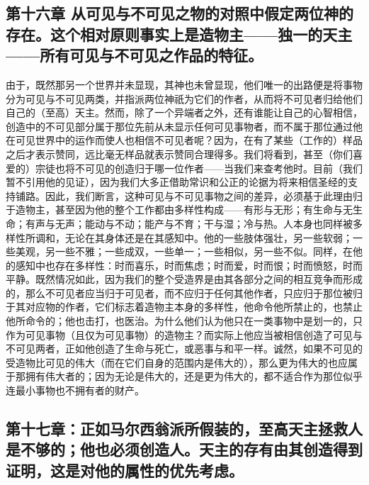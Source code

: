 \subsection{第十六章 从可见与不可见之物的对照中假定两位神的存在。这个相对原则事实上是造物主——独一的天主——所有可见与不可见之作品的特征。}

由于，既然那另一个世界并未显现，其神也未曾显现，他们唯一的出路便是将事物分为可见与不可见两类，并指派两位神祇为它们的作者，从而将不可见者归给他们自己的（至高）天主。然而，除了一个异端者之外，还有谁能让自己的心智相信，创造中的不可见部分属于那位先前从未显示任何可见事物者，而不属于那位通过他在可见世界中的运作而使人也相信不可见者呢？因为，在有了某些（工作的）样品之后才表示赞同，远比毫无样品就表示赞同合理得多。我们将看到，甚至（你们喜爱的）宗徒也将不可见的创造归于哪一位作者——当我们来查考他时。目前（我们暂不引用他的见证），因为我们大多正借助常识和公正的论据为将来相信圣经的支持铺路。因此，我们断言，这种可见与不可见事物之间的差异，必须基于此理由归于造物主，甚至因为他的整个工作都由多样性构成——有形与无形；有生命与无生命；有声与无声；能动与不动；能产与不育；干与湿；冷与热。人本身也同样被多样性所调和，无论在其身体还是在其感知中。他的一些肢体强壮，另一些软弱；一些美观，另一些不雅；一些成双，一些单一；一些相似，另一些不似。同样，在他的感知中也存在多样性：时而喜乐，时而焦虑；时而爱，时而恨；时而愤怒，时而平静。既然情况如此，因为我们的整个受造界是由其各部分之间的相互竞争而形成的，那么不可见者应当归于可见者，而不应归于任何其他作者，只应归于那位被归于其对应物的作者，它们标志着造物主本身的多样性，他命令他所禁止的，也禁止他所命令的；他也击打，也医治。为什么他们认为他只在一类事物中是划一的，只作为可见事物（且仅为可见事物）的造物主？而实际上他应当被相信创造了可见与不可见两者，正如他创造了生命与死亡，或恶事与和平一样。诚然，如果不可见的受造物比可见的伟大（而在它们自身的范围内是伟大的），那么更为伟大的也应属于那拥有伟大者的；因为无论是伟大的，还是更为伟大的，都不适合作为那位似乎连最小事物也不拥有者的财产。\par


\subsection{第十七章：正如马尔西翁派所假装的，至高天主拯救人是不够的；他也必须创造人。天主的存有由其创造得到证明，这是对他的属性的优先考虑。}

